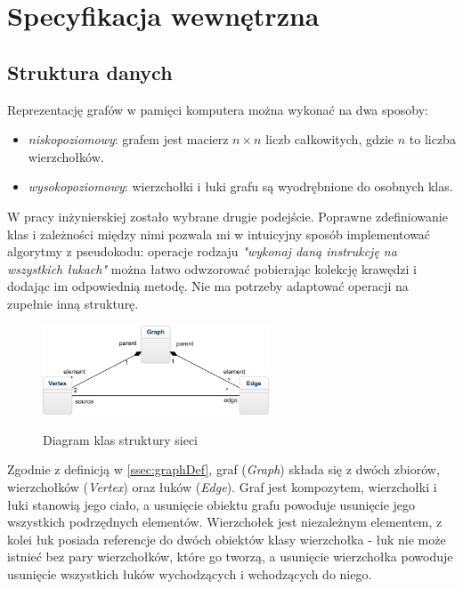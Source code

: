 \chapter{Specyfikacja wewnętrzna}\label{chp:specWew}
\section{Struktura danych}
Reprezentację grafów w pamięci komputera można wykonać na dwa sposoby:
\begin{itemize}
	\item \textit{niskopoziomowy}: grafem jest macierz $ n\times n $ liczb całkowitych, gdzie $ n $ to liczba wierzchołków.\cite{id:AlgorytmyStrukturyStrukturaSieci}
	\item \textit{wysokopoziomowy}: wierzchołki i łuki grafu są wyodrębnione do osobnych klas.
\end{itemize}
W pracy inżynierskiej zostało wybrane drugie podejście. Poprawne zdefiniowanie klas i zależności między nimi pozwala mi w intuicyjny sposób implementować algorytmy z pseudokodu: operacje rodzaju \textit{"wykonaj daną instrukcję na wszystkich łukach"} można łatwo odwzorować pobierając kolekcję krawędzi i dodając im odpowiednią metodę. Nie ma potrzeby adaptować operacji na zupełnie inną strukturę.
\begin{figure}[H]
	\centering
	\includegraphics[width=0.6\textwidth]{./img/dane}
	\label{fig:graphStructure}
	\caption{Diagram klas struktury sieci}
\end{figure}
Zgodnie z definicją w \ref{ssec:graphDef}, graf (\emph{Graph}) składa się z dwóch zbiorów, wierzchołków (\emph{Vertex}) oraz łuków (\emph{Edge}). Graf jest kompozytem, wierzchołki i łuki stanowią jego ciało, a usunięcie obiektu grafu powoduje usunięcie jego wszystkich podrzędnych elementów. Wierzchołek jest niezależnym elementem, z kolei łuk posiada referencje do dwóch obiektów klasy wierzchołka - łuk nie może istnieć bez pary wierzchołków, które go tworzą, a usunięcie wierzchołka powoduje usunięcie wszystkich łuków wychodzących i wchodzących do niego.
